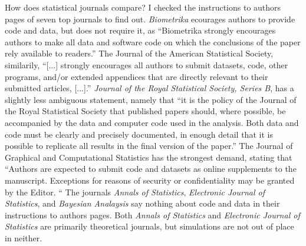 How does statistical journals compare? I checked the instructions
to authors pages of seven top journals to find out. \emph{Biometrika}
ecourages authors to provide code and data, but does not require it,
as ``Biometrika strongly encourages authors to make all data and
software code on which the conclusions of the paper rely available
to readers.'' The Journal of the American Statistical Society, similarily,
``{[}...{]} strongly encourages all authors to submit datasets, code,
other programs, and/or extended appendices that are directly relevant
to their submitted articles, {[}...{]}.'' \emph{Journal of the Royal
Statistical Society, Series B}, has a slightly less ambiguous statement,
namely that ``it is the policy of the Journal of the Royal Statistical
Society that published papers should, where possible, be accompanied
by the data and computer code used in the analysis. Both data and
code must be clearly and precisely documented, in enough detail that
it is possible to replicate all results in the final version of the
paper.'' The Journal of Graphical and Computational Statistics has
the strongest demand, stating that ``Authors are expected to submit
code and datasets as online supplements to the manuscript. Exceptions
for reasons of security or confidentiality may be granted by the Editor.
``
The journals \emph{Annals of Statistics}, \emph{Electronic Journal
of Statistics}, and \emph{Bayesian Analaysis} say nothing about code
and data in their instructions to authors pages. Both \emph{Annals
of Statistics} and \emph{Electronic Journal of Statistics} are primarily
theoretical journals, but simulations are not out of place in neither. 
